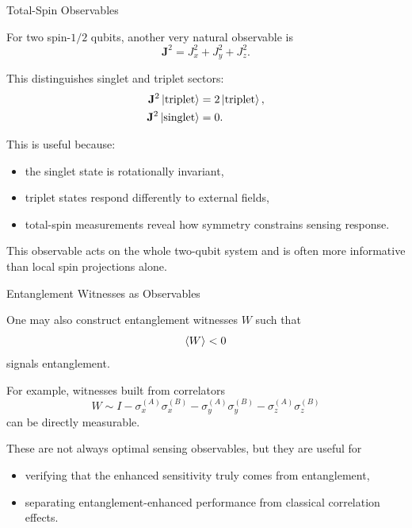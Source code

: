\documentclass{beamer}
\begin{document}
\begin{frame}{Total-Spin Observables}

For two spin-$1/2$ qubits, another very natural observable is
\[
\mathbf{J}^2 = J_x^2 + J_y^2 + J_z^2.
\]

This distinguishes singlet and triplet sectors:
\begin{align}
\mathbf{J}^2 \ket{\text{triplet}} &= 2 \ket{\text{triplet}},\\
\mathbf{J}^2 \ket{\text{singlet}} &= 0.
\end{align}

This is useful because:
\begin{itemize}
    \item the singlet state is rotationally invariant,
    \item triplet states respond differently to external fields,
    \item total-spin measurements reveal how symmetry constrains sensing response.
\end{itemize}

This observable acts on the whole two-qubit system and is often more informative
than local spin projections alone.

\end{frame}

\begin{frame}{Entanglement Witnesses as Observables}

One may also construct entanglement witnesses $W$ such that
\[
\expval{W} < 0
\]
signals entanglement.

For example, witnesses built from correlators
\[
W \sim I - \sigma_x^{(A)}\sigma_x^{(B)}
- \sigma_y^{(A)}\sigma_y^{(B)}
- \sigma_z^{(A)}\sigma_z^{(B)}
\]
can be directly measurable.

These are not always optimal sensing observables, but they are useful for
\begin{itemize}
    \item verifying that the enhanced sensitivity truly comes from entanglement,
    \item separating entanglement-enhanced performance from classical correlation effects.
\end{itemize}

\end{frame}
\end{document}
